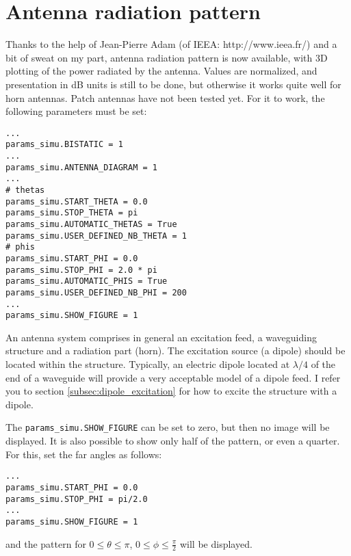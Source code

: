 \documentclass[a4paper,10pt]{book}
\begin{document}
\section{Antenna radiation pattern}
%
\par
Thanks to the help of Jean-Pierre Adam (of IEEA: http://www.ieea.fr/) and a bit of sweat on my part, antenna radiation pattern is now available, with 3D plotting of the power radiated by the antenna. Values are normalized, and presentation in dB units is still to be done, but otherwise it works quite well for horn antennas. Patch antennas have not been tested yet. For it to work, the following parameters must be set:
\begin{verbatim}
...
params_simu.BISTATIC = 1
...
params_simu.ANTENNA_DIAGRAM = 1
...
# thetas
params_simu.START_THETA = 0.0
params_simu.STOP_THETA = pi
params_simu.AUTOMATIC_THETAS = True
params_simu.USER_DEFINED_NB_THETA = 1
# phis
params_simu.START_PHI = 0.0
params_simu.STOP_PHI = 2.0 * pi
params_simu.AUTOMATIC_PHIS = True
params_simu.USER_DEFINED_NB_PHI = 200
...
params_simu.SHOW_FIGURE = 1
\end{verbatim}
%
\par
An antenna system comprises in general an excitation feed, a waveguiding structure and a radiation part (horn). The excitation source (a dipole) should be located within the structure. Typically, an electric dipole located at $\lambda/4$ of the end of a waveguide will provide a very acceptable model of a dipole feed. I refer you to section \ref{subsec:dipole_excitation} for how to excite the structure with a dipole. 
%
\par
The \texttt{params\_simu.SHOW\_FIGURE} can be set to zero, but then no image will be displayed. It is also possible to show only half of the pattern, or even a quarter. For this, set the far angles as follows:
\begin{verbatim}
...
params_simu.START_PHI = 0.0
params_simu.STOP_PHI = pi/2.0
...
params_simu.SHOW_FIGURE = 1
\end{verbatim}
and the pattern for $0\leq \theta \leq \pi$, $0\leq \phi \leq \frac{\pi}{2}$ will be displayed. 


\end{document}
